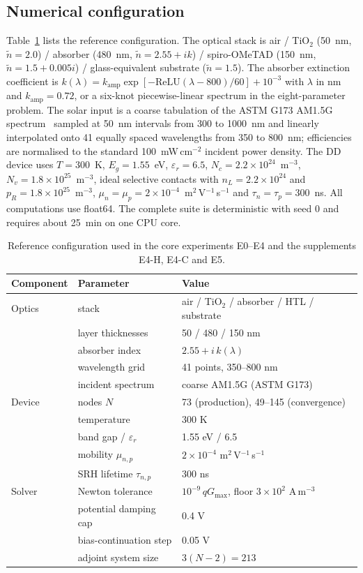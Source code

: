 \documentclass[preprint,12pt]{elsarticle}
\begin{document}
\subsection{Numerical configuration}
\label{sec:config}

Table~\ref{tab:config} lists the reference configuration. The optical stack
is air / TiO$_2$ (50~nm, $\tilde n=2.0$) / absorber (480~nm,
$\tilde n=2.55+ik$) / spiro-OMeTAD (150~nm, $\tilde n=1.5+0.005i$) /
glass-equivalent substrate ($\tilde n=1.5$). The absorber extinction
coefficient is $k(\lambda)=k_{\mathrm{amp}}\exp[-\mathrm{ReLU}(\lambda-800)/60]+10^{-3}$
with $\lambda$ in nm and $k_{\mathrm{amp}}=0.72$, or a six-knot
piecewise-linear spectrum in the eight-parameter problem. The solar input is
a coarse tabulation of the ASTM G173 AM1.5G spectrum~\cite{astm2020} sampled
at 50~nm intervals from 300 to 1000~nm and linearly interpolated onto 41
equally spaced wavelengths from 350 to 800~nm; efficiencies are normalised
to the standard 100~mW\,cm$^{-2}$ incident power density. The DD device uses $T=300$~K, $E_g=1.55$~eV,
$\varepsilon_r=6.5$, $N_c=2.2\times10^{24}$~m$^{-3}$,
$N_v=1.8\times10^{25}$~m$^{-3}$, ideal selective contacts with
$n_L=2.2\times10^{24}$ and $p_R=1.8\times10^{25}$~m$^{-3}$,
$\mu_n=\mu_p=2\times10^{-4}$~m$^2$\,V$^{-1}$\,s$^{-1}$ and
$\tau_n=\tau_p=300$~ns. All computations use float64. The complete suite is
deterministic with seed 0 and requires about 25~min on one CPU core.

\begin{table}[t]
\caption{Reference configuration used in the core experiments E0--E4
and the supplements E4-H, E4-C and E5.}
\label{tab:config}
\centering
\small
\begin{tabular}{lll}
\toprule
Component & Parameter & Value \\
\midrule
Optics & stack & air / TiO$_2$ / absorber / HTL / substrate \\
       & layer thicknesses & 50 / 480 / 150 nm \\
       & absorber index & $2.55 + i\,k(\lambda)$ \\
       & wavelength grid & 41 points, 350--800 nm \\
       & incident spectrum & coarse AM1.5G (ASTM G173) \\
Device & nodes $N$ & 73 (production), 49--145 (convergence) \\
       & temperature & 300 K \\
       & band gap / $\varepsilon_r$ & 1.55 eV / 6.5 \\
       & mobility $\mu_{n,p}$ & $2\times10^{-4}$ m$^2$\,V$^{-1}$\,s$^{-1}$ \\
       & SRH lifetime $\tau_{n,p}$ & 300 ns \\
Solver & Newton tolerance & $10^{-9}\,qG_{\max}$, floor $3\times10^2$ A\,m$^{-3}$ \\
       & potential damping cap & 0.4 V \\
       & bias-continuation step & 0.05 V \\
       & adjoint system size & $3(N-2)=213$ \\
\bottomrule
\end{tabular}
\end{table}
\end{document}

